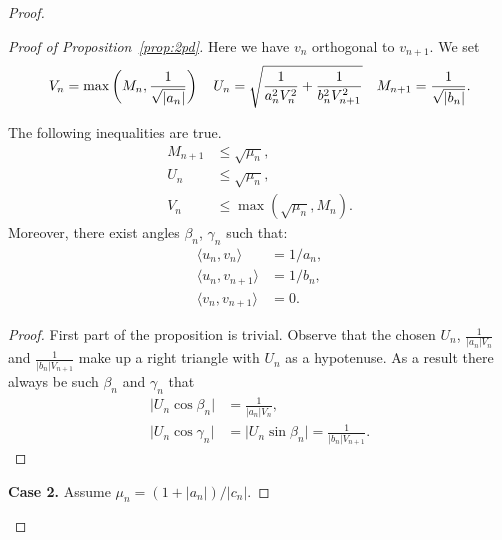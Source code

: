 \begin{proof}
\begin{proof}[Proof of Proposition~\ref{prop:2pd}]
          Here we have $v_n$ orthogonal to $v_{n+1}$.
          We set
          \begin{align*}
              V_n = \max\left(M_n, \frac{1}{\sqrt{\smash[b]{\lvert a_n \rvert}}}\right) \quad
              U_n = \sqrt{\frac{1}{a_n^2 V_n^2} + \frac{1}{b_n^2 V_{n+1}^2}} \quad
              M_{n+1} = \frac{1}{\sqrt{\smash[b]{\lvert b_n \rvert}}}.
          \end{align*}
          \begin{prop}
            The following inequalities are true.
            \begin{align*}
              M_{n+1} &\leq \sqrt{\mu_n},\\
              U_n &\leq \sqrt{\mu_n},\\
              V_n &\leq \max(\sqrt{\mu_n}, M_n).
            \end{align*}
            Moreover, there exist angles $\beta_n$, $\gamma_n$ such that:
            \begin{equation}
              \label{eqn:case1}
              \begin{aligned}
                \langle u_n, v_n \rangle &= 1/a_n,\\
                \langle u_n, v_{n+1} \rangle &= 1/b_n,\\
                \langle v_n, v_{n+1} \rangle &= 0.
              \end{aligned}
            \end{equation}
          \end{prop}
          \begin{proof}
            First part of the proposition is trivial.
            Observe that the chosen $U_n$, $\frac{1}{\lvert a_n \rvert V_n}$ and $\frac{1}{\lvert b_n \rvert V_{n+1}}$
              make up a right triangle with $U_n$ as a hypotenuse.
            As a result there always be such $\beta_n$ and $\gamma_n$ that
            \begin{align*}
              \lvert U_n \cos{\beta_n} \rvert &= \frac{1}{\lvert a_n \rvert V_n},\\
              \lvert U_n \cos{\gamma_n}\rvert &= \lvert U_n \sin{\beta_n}\rvert = \frac{1}{\lvert b_n \rvert V_{n+1}}.
            \end{align*}
          \end{proof}
        \noindent\textbf{Case 2.} Assume $\mu_n = (1 + |a_n|)/|c_n|$.


\end{proof}
\end{proof}
